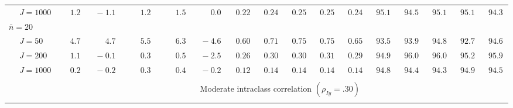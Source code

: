 \begin{sidewaystable}
\begin{threeparttable}
\begin{tabular}{llccccccccccccccc}
 & \nopagebreak $\;J=1000$  & $\phantom{0}\phantom{-}1.2\phantom{0}$ & $\phantom{0}{-}1.1\phantom{0}$ & $\phantom{0}\phantom{-}1.2\phantom{0}$ & $\phantom{0}\phantom{-}1.5\phantom{0}$ & $\phantom{0}\phantom{-}0.0\phantom{0}$ & $\phantom{0}0.22\phantom{0}$ & $\phantom{0}0.24\phantom{0}$ & $\phantom{0}0.25\phantom{0}$ & $\phantom{0}0.25\phantom{0}$ & $\phantom{0}0.24\phantom{0}$ & $\phantom{0}95.1\phantom{0}$ & $\phantom{0}94.5\phantom{0}$ & $\phantom{0}95.1\phantom{0}$ & $\phantom{0}95.1\phantom{0}$ & $\phantom{0}94.3\phantom{0}$ \\
\multicolumn{4}{l}{$\bar{n}=20$} \\  & \nopagebreak $\;J=50$  & $\phantom{0}\phantom{-}4.7\phantom{0}$ & $\phantom{0}\phantom{-}4.7\phantom{0}$ & $\phantom{0}\phantom{-}5.5\phantom{0}$ & $\phantom{0}\phantom{-}6.3\phantom{0}$ & $\phantom{0}{-}4.6\phantom{0}$ & $\phantom{0}0.60\phantom{0}$ & $\phantom{0}0.71\phantom{0}$ & $\phantom{0}0.75\phantom{0}$ & $\phantom{0}0.75\phantom{0}$ & $\phantom{0}0.65\phantom{0}$ & $\phantom{0}93.5\phantom{0}$ & $\phantom{0}93.9\phantom{0}$ & $\phantom{0}94.8\phantom{0}$ & $\phantom{0}92.7\phantom{0}$ & $\phantom{0}94.6\phantom{0}$ \\
 & \nopagebreak $\;J=200$  & $\phantom{0}\phantom{-}1.1\phantom{0}$ & $\phantom{0}{-}0.1\phantom{0}$ & $\phantom{0}\phantom{-}0.3\phantom{0}$ & $\phantom{0}\phantom{-}0.5\phantom{0}$ & $\phantom{0}{-}2.5\phantom{0}$ & $\phantom{0}0.26\phantom{0}$ & $\phantom{0}0.30\phantom{0}$ & $\phantom{0}0.30\phantom{0}$ & $\phantom{0}0.31\phantom{0}$ & $\phantom{0}0.29\phantom{0}$ & $\phantom{0}94.9\phantom{0}$ & $\phantom{0}96.0\phantom{0}$ & $\phantom{0}96.0\phantom{0}$ & $\phantom{0}95.2\phantom{0}$ & $\phantom{0}95.9\phantom{0}$ \\
 & \nopagebreak $\;J=1000$  & $\phantom{0}\phantom{-}0.2\phantom{0}$ & $\phantom{0}{-}0.2\phantom{0}$ & $\phantom{0}\phantom{-}0.3\phantom{0}$ & $\phantom{0}\phantom{-}0.4\phantom{0}$ & $\phantom{0}{-}0.2\phantom{0}$ & $\phantom{0}0.12\phantom{0}$ & $\phantom{0}0.14\phantom{0}$ & $\phantom{0}0.14\phantom{0}$ & $\phantom{0}0.14\phantom{0}$ & $\phantom{0}0.14\phantom{0}$ & $\phantom{0}94.8\phantom{0}$ & $\phantom{0}94.4\phantom{0}$ & $\phantom{0}94.3\phantom{0}$ & $\phantom{0}94.9\phantom{0}$ & $\phantom{0}94.5\phantom{0}$ \\
[0.5ex]\hline\\[-1.6ex] 
& & \multicolumn{15}{c}{Moderate intraclass correlation $(\rho_{Iy}=.30)$} \\[0.6ex]\hline\\[-1.8ex]

\end{tabular}
\end{threeparttable}
\end{sidewaystable}
